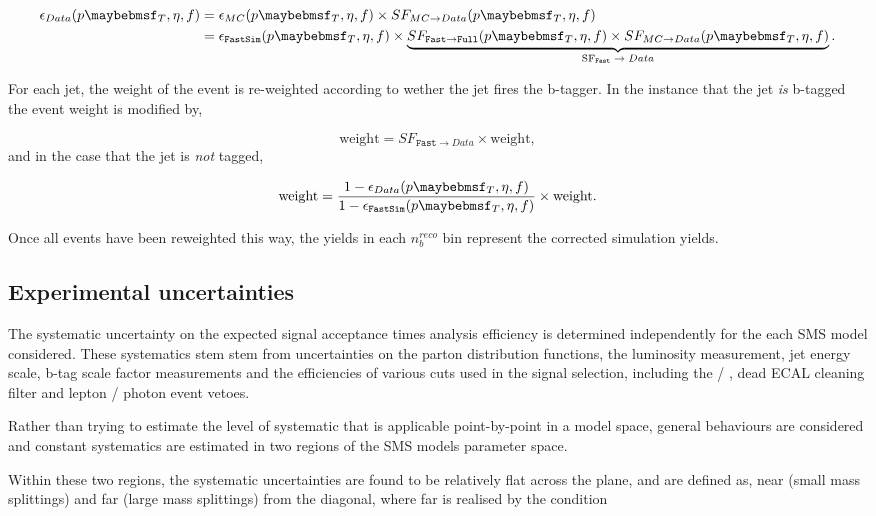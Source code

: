 \begin{align}
\epsilon_{Data}(\pt,\eta,f) &=  \epsilon_{MC}(\pt,\eta,f) \times SF_{MC\rightarrow Data}(\pt,\eta,f) \nonumber \\
&=  \epsilon_{\texttt{FastSim}}(\pt,\eta,f) \times \underbrace{SF_{\texttt{Fast}\rightarrow\texttt{Full}}(\pt,\eta,f) \times SF_{MC\rightarrow Data}(\pt,\eta,f)}_\text{SF$_{\texttt{Fast}} \rightarrow Data$}.
\end{align}

For each jet, the weight of the event is re-weighted according to wether the jet fires the b-tagger. In the instance that the jet \emph{is} b-tagged the event weight is modified by,

\begin{equation}
\text{weight} = SF_{\texttt{Fast} \rightarrow Data} \times \text{weight},
\end{equation} 
and in the case that the jet is \emph{not} tagged,

\begin{equation}
\text{weight} = \frac{1-\epsilon_{Data}(\pt,\eta,f)}{1- \epsilon_{\texttt{FastSim}}(\pt,\eta,f)}\times \text{weight}.
\end{equation}

 Once all events have been reweighted this way, the yields in each $n_{b}^{reco}$ bin represent the corrected simulation yields. 

\subsection{Experimental uncertainties}

The systematic uncertainty on the expected signal acceptance times analysis efficiency is determined independently for the each \ac{SMS} model considered. These systematics stem stem from uncertainties on the parton distribution functions, the luminosity measurement, jet energy scale, b-tag scale factor measurements and the efficiencies of various cuts used in the signal selection, including the \mht / \met, dead \ac{ECAL} cleaning filter and lepton / photon event vetoes. 

Rather than trying to estimate the level of systematic that is applicable point-by-point in a model space, general behaviours are considered and constant systematics are estimated in two regions of the \ac{SMS} models parameter space. 

Within these two regions, the systematic uncertainties are found to be relatively flat across the plane, and are defined as, near (small mass splittings) and far (large mass splittings) from the diagonal, where far is realised by the condition

